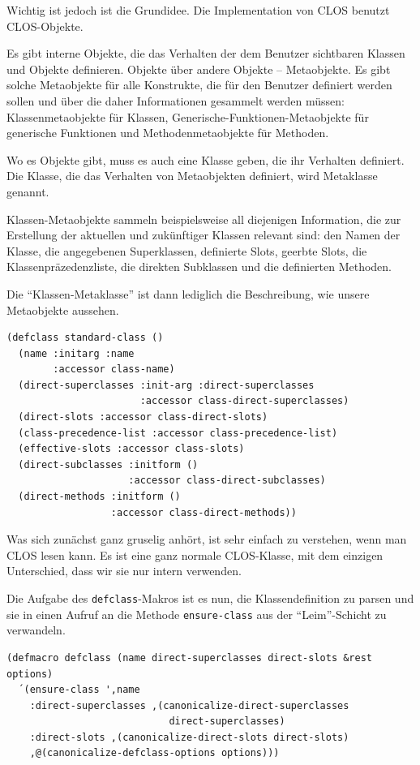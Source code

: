 Wichtig ist jedoch ist die Grundidee. Die Implementation von CLOS benutzt CLOS-Objekte.

Es gibt interne Objekte, die das Verhalten der dem Benutzer sichtbaren Klassen und Objekte definieren. Objekte über andere Objekte -- Metaobjekte. Es gibt solche Metaobjekte für alle Konstrukte, die für den Benutzer definiert werden sollen und über die daher Informationen gesammelt werden müssen: Klassenmetaobjekte für Klassen, Generische-Funktionen-Metaobjekte für generische Funktionen und Methodenmetaobjekte für Methoden. 

Wo es Objekte gibt, muss es auch eine Klasse geben, die ihr Verhalten definiert. Die Klasse, die das Verhalten von Metaobjekten definiert, wird Metaklasse genannt. 

Klassen-Metaobjekte sammeln beispielsweise all diejenigen Information, die zur Erstellung der aktuellen und zukünftiger Klassen relevant sind: den Namen der Klasse, die angegebenen Superklassen, definierte Slots, geerbte Slots, die Klassenpräzedenzliste, die direkten Subklassen und die definierten Methoden. 

Die ``Klassen-Metaklasse'' ist dann lediglich die Beschreibung, wie unsere Metaobjekte aussehen.

\begin{lstlisting}
(defclass standard-class ()
  (name :initarg :name
        :accessor class-name)
  (direct-superclasses :init-arg :direct-superclasses
                       :accessor class-direct-superclasses)
  (direct-slots :accessor class-direct-slots)
  (class-precedence-list :accessor class-precedence-list)
  (effective-slots :accessor class-slots)
  (direct-subclasses :initform ()
                     :accessor class-direct-subclasses)
  (direct-methods :initform ()
                  :accessor class-direct-methods))
\end{lstlisting}

Was sich zunächst ganz gruselig anhört, ist sehr einfach zu verstehen, wenn man CLOS lesen kann. Es ist eine ganz normale CLOS-Klasse, mit dem einzigen Unterschied, dass wir sie nur intern verwenden.

Die Aufgabe des \texttt{defclass}-Makros ist es nun, die Klassendefinition zu parsen und sie in einen Aufruf an die Methode \texttt{ensure-class} aus der ``Leim''-Schicht zu verwandeln. 

\begin{lstlisting}
(defmacro defclass (name direct-superclasses direct-slots &rest options)
  ´(ensure-class ',name
    :direct-superclasses ,(canonicalize-direct-superclasses 
                            direct-superclasses)
    :direct-slots ,(canonicalize-direct-slots direct-slots)
    ,@(canonicalize-defclass-options options)))
\end{lstlisting}

